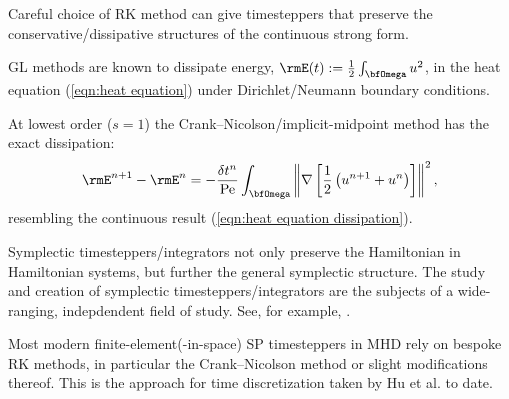     Careful choice of RK method can give timesteppers that preserve the conservative/dissipative structures of the continuous strong form.

    \line
    
    \begin{example}
        GL methods are known to dissipate energy, $\rmE(t)  :=  \frac{1}{2}\int_{\bfOmega}u^{2}$, in the heat equation (\ref{eqn:heat equation}) under Dirichlet/Neumann boundary conditions.
        
        At lowest order ($s  =  1$) the Crank--Nicolson/implicit-midpoint method has the exact dissipation:
        \begin{equation}\label{eqn:heat equation dissipation implicit midpoint}
            \rmE^{n + 1} - \rmE^{n}  =  - \frac{\delta t^{n}}{\rmPe}\int_{\bfOmega}\left\|\nabla\left[\frac{1}{2}\left(u^{n + 1} + u^{n}\right)\right]\right\|^{2},
        \end{equation}
        resembling the continuous result (\ref{eqn:heat equation dissipation}).
    \end{example}
    
    \begin{example}
        Symplectic timesteppers/integrators not only preserve the Hamiltonian in Hamiltonian systems, but further the general symplectic structure. The study and creation of symplectic timesteppers/integrators are the subjects of a wide-ranging, indepdendent field of study. See, for example, \cite{Hairer_Lubich_Wanner_2006}.
    \end{example}
    
    \line

    Most modern finite-element(-in-space) SP timesteppers in MHD rely on bespoke RK methods, in particular the Crank--Nicolson method or slight modifications thereof. This is the approach for time discretization taken by Hu et al. to date. \cite{Hu_Lee_Xu_2021, Laakmann_Hu_Farrell_2022}
    